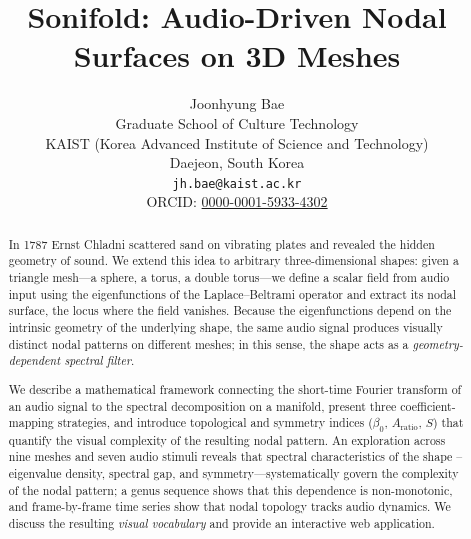 \documentclass[]{interact}
\theoremstyle{plain}
\theoremstyle{definition}
\theoremstyle{remark}
\begin{document}

\title{Sonifold: Audio-Driven Nodal Surfaces on 3D Meshes}

\author{
  Joonhyung Bae \\
  Graduate School of Culture Technology \\
  KAIST (Korea Advanced Institute of Science and Technology) \\
  Daejeon, South Korea \\
  \texttt{jh.bae@kaist.ac.kr} \\
ORCID: \href{https://orcid.org/0000-0001-5933-4302}{0000-0001-5933-4302}
}

\maketitle

\begin{abstract}
In 1787 Ernst Chladni scattered sand on vibrating plates and revealed the hidden geometry of sound. We extend this idea to arbitrary three-dimensional shapes: given a triangle mesh---a sphere, a torus, a double torus---we define a scalar field from audio input using the eigenfunctions of the Laplace--Beltrami operator and extract its nodal surface, the locus where the field vanishes. Because the eigenfunctions depend on the intrinsic geometry of the underlying shape, the same audio signal produces visually distinct nodal patterns on different meshes; in this sense, the shape acts as a \emph{geometry-dependent spectral filter}.

We describe a mathematical framework connecting the short-time Fourier transform of an audio signal to the spectral decomposition on a manifold, present three coefficient-mapping strategies, and introduce topological and symmetry indices ($\beta_0$, $A_{\mathrm{ratio}}$, $S$) that quantify the visual complexity of the resulting nodal pattern. An exploration across nine meshes and seven audio stimuli reveals that spectral characteristics of the shape --eigenvalue density, spectral gap, and symmetry---systematically govern the complexity of the nodal pattern; a genus sequence shows that this dependence is non-monotonic, and frame-by-frame time series show that nodal topology tracks audio dynamics. We discuss the resulting \emph{visual vocabulary} and provide an interactive web application.
\end{abstract}
\end{document}
